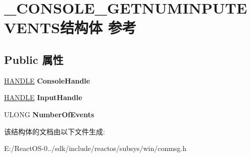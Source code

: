 \hypertarget{struct___c_o_n_s_o_l_e___g_e_t_n_u_m_i_n_p_u_t_e_v_e_n_t_s}{}\section{\+\_\+\+C\+O\+N\+S\+O\+L\+E\+\_\+\+G\+E\+T\+N\+U\+M\+I\+N\+P\+U\+T\+E\+V\+E\+N\+T\+S结构体 参考}
\label{struct___c_o_n_s_o_l_e___g_e_t_n_u_m_i_n_p_u_t_e_v_e_n_t_s}
\subsection*{Public 属性}
\begin{DoxyCompactItemize}
\item 
\mbox{\label{struct___c_o_n_s_o_l_e___g_e_t_n_u_m_i_n_p_u_t_e_v_e_n_t_s_af424c87797e7c7103b1c8a7476b4b1db}} 
\hyperlink{interfacevoid}{H\+A\+N\+D\+LE} {\bfseries Console\+Handle}
\item 
\mbox{\label{struct___c_o_n_s_o_l_e___g_e_t_n_u_m_i_n_p_u_t_e_v_e_n_t_s_a3202ef5727d4249f73c86641d5cbc3b8}} 
\hyperlink{interfacevoid}{H\+A\+N\+D\+LE} {\bfseries Input\+Handle}
\item 
\mbox{\label{struct___c_o_n_s_o_l_e___g_e_t_n_u_m_i_n_p_u_t_e_v_e_n_t_s_a19485797bbc926d8b403d6e4a03868ee}} 
U\+L\+O\+NG {\bfseries Number\+Of\+Events}
\end{DoxyCompactItemize}


该结构体的文档由以下文件生成\+:\begin{DoxyCompactItemize}
\item 
E\+:/\+React\+O\+S-\/0../sdk/include/reactos/subsys/win/conmsg.\+h\end{DoxyCompactItemize}
